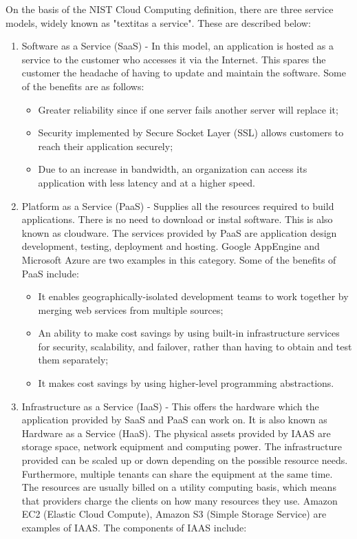On the basis of the NIST Cloud Computing definition, there are three service models, widely known as "textit{as a service}". These are described below:

\begin{enumerate}

\item Software as a Service (SaaS) - In this model, an application is hosted as a service to the customer who accesses it via the Internet. This spares the customer the headache of having to update and maintain the software. Some of the benefits are as follows:

\begin{itemize}
\item Greater reliability since if one server fails another server will replace it;
\item Security implemented by Secure Socket Layer (SSL) allows customers to reach their application securely;
\item Due to an increase in bandwidth, an organization can access its application with less latency and at a higher speed.
\end{itemize}

\item Platform as a Service (PaaS) - Supplies all the resources required to build applications. There is no need to download or instal software. This is also known as cloudware. The services provided by PaaS are application design development, testing, deployment and hosting. Google AppEngine and Microsoft Azure are two examples in this category. Some of the benefits of PaaS include: 

\begin{itemize}
\item It enables geographically-isolated development teams to work together by merging web services from multiple sources;
\item An ability to make cost savings by using built-in infrastructure services for security, scalability, and failover, rather than having to obtain and test them separately;
\item It makes cost savings by using higher-level programming abstractions.
\end{itemize}

\item Infrastructure as a Service (IaaS) - This offers the hardware which the application provided by SaaS and PaaS can work on. It is also known as Hardware as a Service (HaaS). The physical assets provided by IAAS are storage space, network equipment and computing power. The infrastructure provided can be scaled up or down depending on the possible resource needs. Furthermore, multiple tenants can share the equipment at the same time. The resources are usually billed on a utility computing basis, which means that providers charge the clients on how many resources they use. Amazon EC2 (Elastic Cloud Compute), Amazon S3 (Simple Storage Service) are examples of IAAS. The components of IAAS include:


\end{enumerate}
